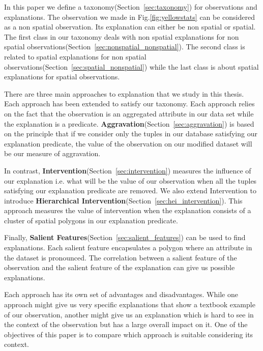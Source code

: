 In this paper we define a taxonomy(Section~\ref{sec:taxonomy}) for observations and explanations. The observation we made in Fig.\ref{fig:yellowstats} can be considered as a non spatial observation. Its explanation can either be non spatial or spatial. The first class in our taxonomy deals with non spatial explanations for non spatial observations(Section~\ref{sec:nonspatial_nonspatial}). The second class is related to spatial explanations for non spatial observations(Section~\ref{sec:spatial_nonspatial}) while the last class is about spatial explanations for spatial observations.

There are three main approaches to explanation that we study in this thesis. Each approach has been extended to satisfy our taxonomy. Each approach relies on the fact that the observation is an aggregated attribute in our data set while the explanation is a predicate. \textbf{Aggravation}(Section~\ref{sec:aggravation}) is based on the principle that if we consider only the tuples in our database satisfying our explanation predicate, the value of the observation on our modified dataset will be our measure of aggravation\citep{roy2014formal,meliou2014causality}.

In contrast, \textbf{Intervention}(Section~\ref{sec:intervention}) measures the influence of our explanation i.e. what will be the value of our observation when all the tuples satisfying our explanation predicate are removed\citep{roy2014formal}. We also extend Intervention to introduce \textbf{Hierarchical Intervention}(Section~\ref{sec:hei_intervention}). This approach measures the value of intervention when the explanation consists of a cluster of spatial polygons in our explanation predicate.

Finally, \textbf{Salient Features}(Section~\ref{sec:salient_features}) can be used to find explanations\citep{chirigati2016data}. Each salient feature encapsulates a polygon where an attribute in the dataset is pronounced. The correlation between a salient feature of the observation and the salient feature of the explanation can give us possible explanations.

Each approach has its own set of advantages and disadvantages. While one approach might give us very specific explanations that show a textbook example of our observation, another might give us an explanation which is hard to see in the context of the observation but has a large overall impact on it. One of the objectives of this paper is to compare which approach is suitable considering its context. 

